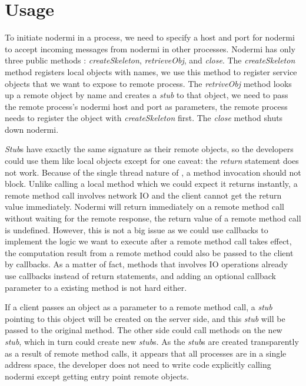\section{Usage}

To initiate nodermi in a process, we need to specify a host and port for nodermi
to accept incoming messages from nodermi in other processes.
Nodermi has only three public methods : \emph{createSkeleton},
\emph{retrieveObj}, and \emph{close}.
The \emph{createSkeleton} method registers local objects with names,
we use this method to register service objects that we want to expose to
remote process.
The \emph{retriveObj} method looks up a remote object by name and creates
a \emph{stub} to that object,
we need to pass the remote process's nodermi host and port as parameters,
the remote process needs to register the object with \emph{createSkeleton} first.
The \emph{close} method shuts down nodermi.

\emph{Stub}s have exactly the same signature as their remote objects,
so the developers could use them like local objects except for one caveat:
the \emph{return} statement does not work.
Because of the single thread nature of \js{},
a method invocation should not block.
Unlike calling a local method which we could expect it returns instantly,
a remote method call involves network IO and the client cannot get the
return value immediately.
Nodermi will return immediately on a remote method call without waiting for
the remote response, the return value of a remote method call is undefined.
However, this is not a big issue as we could use callbacks to
implement the logic we want to execute after a remote method call takes effect,
the computation result from a remote method could also be passed to the client by callbacks.
As a matter of fact, methods that involves IO operations already use callbacks instead
of return statements,
and adding an optional callback parameter to a existing method is not hard
either.

If a client passes an object as a parameter to a remote method call,
a \emph{stub} pointing to this object will be created on the server side,
and this \emph{stub} will be passed to the original method.
The other side could call methods on the new \emph{stub}, which
in turn could create new \emph{stub}s.
As the \emph{stub}s are created transparently
as a result of remote method calls,
it appears that all processes are in a single address space,
the developer does not need to write code explicitly calling nodermi except
getting entry point remote objects.


